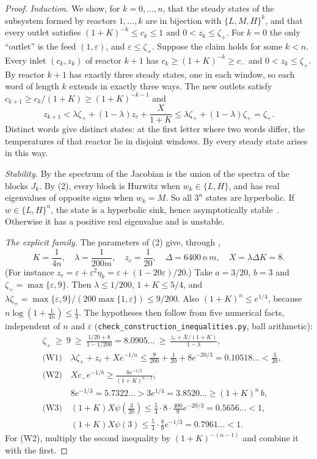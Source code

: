 \documentclass[11pt,a4paper]{report}
\newcommand*{\eps}{\varepsilon}
\begin{document}
\begin{proof}
\emph{Induction.} We show, for \(k=0,\dots,n\), that the steady states of the subsystem formed by reactors
\(1,\dots,k\) are in bijection with \(\{L,M,H\}^k\), and that every outlet satisfies \((1+K)^{-k}\le c_k\le1\) and
\(0<z_k\le\zeta_+\). For \(k=0\) the only ``outlet'' is the feed \((1,\eps)\), and \(\eps\le\zeta_+\). Suppose the claim
holds for some \(k<n\). Every inlet \((c_k,z_k)\) of reactor \(k+1\) has \(c_k\ge(1+K)^{-k}\ge c_-\) and
\(0<z_k\le\zeta_+\). By  reactor \(k+1\) has exactly three steady states, one in each window, so
each word of length \(k\) extends in exactly three ways. The new outlets satisfy \(c_{k+1}\ge c_k/(1+K)\ge(1+K)^{-k-1}\)
and
\[
z_{k+1}<\lambda\zeta_++(1-\lambda)z_c+\frac X{1+K}\le\lambda\zeta_++(1-\lambda)\zeta_+=\zeta_+ .
\]
Distinct words give distinct states: at the first letter where two words differ, the temperatures of that reactor lie
in disjoint windows. By  every steady state arises in this way.

\emph{Stability.} By  the spectrum of the Jacobian is the union of the spectra of the blocks
\(J_k\). By (2), every block is Hurwitz when \(w_k\in\{L,H\}\), and has real eigenvalues of opposite
signs when \(w_k=M\). So all \(3^n\) states are hyperbolic. If \(w\in\{L,H\}^n\), the state is a hyperbolic sink,
hence asymptotically stable~\autocite[§2.9]{Perko2001}. Otherwise it has a positive real eigenvalue and is unstable.

\emph{The explicit family.} The parameters of (2) give, through ,
\[
K=\frac1{4n},\quad \lambda=\frac1{200m},\quad z_c=\frac1{20},\quad \Delta=6400\,n\,m,\quad X=\lambda\Delta K=8 .
\]
(For instance \(z_c=\eps+\eps^2\eta_k=\eps+(1-20\eps)/20\).) Take \(a=3/20\), \(b=3\) and \(\zeta_+=\max\{\eps,9\}\).
Then \(\lambda\le1/200\), \(1+K\le5/4\), and \(\lambda\zeta_+=\max\{\eps,9\}/(200\max\{1,\eps\})\le9/200\). Also
\((1+K)^n\le e^{1/4}\), because \(n\log(1+\frac1{4n})\le\frac14\). The hypotheses then follow from five numerical
facts, independent of \(n\) and \(\eps\) (\texttt{check\_construction\_inequalities.py}, ball arithmetic):
\begin{align*}
&\zeta_+\ \ge\ 9\ \ge\ \frac{1/20+8}{1-1/200}=8.0905\ldots\ \ge\ \frac{z_c+X/(1+K)}{1-\lambda},\\
&\text{(W1)}\quad \lambda\zeta_++z_c+Xe^{-1/a}\le\tfrac9{200}+\tfrac1{20}+8e^{-20/3}=0.10518\ldots<\tfrac3{20},\\
&\text{(W2)}\quad Xc_-e^{-1/b}\ge\frac{8e^{-1/3}}{(1+K)^{n-1}},\\
&\phantom{\text{(W2)}}\quad 8e^{-1/3}=5.7322\ldots>3e^{1/4}=3.8520\ldots\ge(1+K)^n\,b,\\
&\text{(W3)}\quad (1+K)X\psi(\tfrac3{20})\le\tfrac54\cdot8\cdot\tfrac{400}9e^{-20/3}=0.5656\ldots<1,\\
&\phantom{\text{(W3)}}\quad (1+K)X\psi(3)\le\tfrac54\cdot\tfrac89e^{-1/3}=0.7961\ldots<1.
\end{align*}
For (W2), multiply the second inequality by \((1+K)^{-(n-1)}\) and combine it with the first.
\end{proof}
\end{document}
